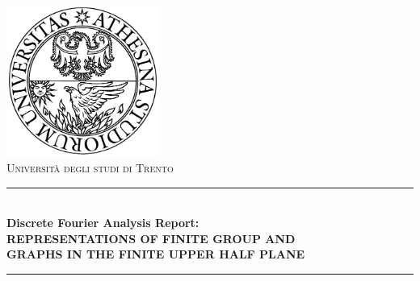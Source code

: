 \begin{titlepage}

\newcommand{\HRule}{\rule{\linewidth}{0.5mm}} %

\center %
 
\includegraphics[width = 50mm]{unitn.jpg}\\[0.5cm]
\textsc{\LARGE Università degli studi di Trento}\\[1cm] %


\HRule \\[0.4cm]
{ \Large \bfseries Discrete Fourier Analysis Report: \\ REPRESENTATIONS OF FINITE GROUP AND \\[0.3cm] GRAPHS IN THE FINITE UPPER HALF PLANE}\\[0.2cm] %
\HRule \\[1.5cm]
 

%


\end{titlepage}

